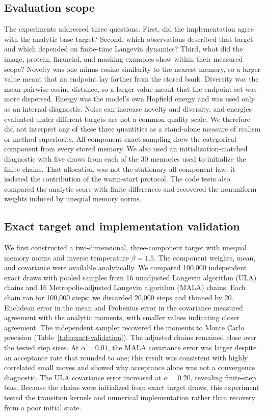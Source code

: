 
\subsection{Evaluation scope}

The experiments addressed three questions. First,
did the implementation agree with the analytic base target? Second, which
observations described that target and which depended on finite-time Langevin
dynamics? Third, what did the image, protein, financial, and masking examples
show within their measured scope? Novelty was one minus cosine similarity to
the nearest memory, so a larger value meant that an endpoint lay farther from
the stored bank. Diversity was the mean pairwise cosine distance, so a larger
value meant that the endpoint set was more dispersed. Energy was the model's
own Hopfield energy and was used only as an internal diagnostic. Noise can
increase novelty and diversity, and energies evaluated under different targets
are not a common quality scale. We therefore did not interpret any of these
three quantities as a stand-alone measure of realism or method superiority.
All-component exact sampling drew the categorical component from every stored
memory. We also used an initialization-matched diagnostic with five draws from
each of the 30 memories used to initialize the finite chains. That allocation
was not the stationary all-component law; it isolated the contribution of the
warm-start protocol. The code tests also compared the analytic score with
finite differences and recovered the nonuniform weights induced by unequal
memory norms.

\subsection{Exact target and implementation validation}

We first constructed a two-dimensional, three-component target with unequal
memory norms and inverse temperature $\beta=1.5$. The component weights, mean,
and covariance were available analytically. We compared 100,000 independent
exact draws with pooled samples from 16 unadjusted Langevin algorithm (ULA)
chains and 16 Metropolis-adjusted Langevin algorithm (MALA) chains. Each chain
ran for 100,000 steps; we discarded 20,000 steps and thinned by 20. Euclidean
error in the mean and Frobenius error in the covariance measured agreement with
the analytic moments, with smaller values indicating closer agreement. The
independent sampler recovered the moments to Monte Carlo precision
(Table~\ref{tab:exact-validation}). The adjusted chains remained close over the
tested step sizes. At $\alpha=0.01$, the MALA covariance error was larger
despite an acceptance rate that rounded to one; this result was consistent with highly
correlated small moves and showed why acceptance alone was not a convergence
diagnostic. The ULA covariance error increased at $\alpha=0.20$, revealing
finite-step bias. Because the chains were initialized from exact target draws,
this experiment tested the transition kernels and numerical implementation
rather than recovery from a poor initial state.

